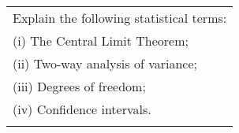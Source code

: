 \documentclass[a4paper,12pt]{article}
\begin{document}
\begin{table}[ht!]
     
\centering
     
\begin{tabular}{|p{15cm}|}
     
\hline   
\noindent Explain the following statistical terms:\\
(i) The Central Limit Theorem; \\
(ii) Two-way analysis of variance; \\
(iii) Degrees of freedom; \\ 
(iv) Confidence intervals.\\
\\ \hline
      
\end{tabular}
    
\end{table}
\end{document}
